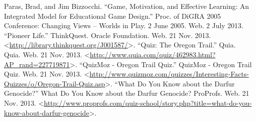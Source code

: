 \documentclass[12pt]{report}
\begin{document}
\begin{thebibliography}{1}
\bibitem{} Paras, Brad, and Jim Bizzocchi. ``Game, Motivation, and Effective Learning: An Integrated Model for Educational Game Design.'' Proc. of DiGRA 2005 Conference: Changing Views – Worlds in Play. 2 June 2005. Web. 2 July 2013.
\bibitem{} ``Pioneer Life.'' ThinkQuest. Oracle Foundation. Web. 21 Nov. 2013. \textless \url{http://library.thinkquest.org/J001587/}\textgreater.
\bibitem{} ``Quiz: The Oregon Trail.'' Quia. Quia. Web. 21 Nov. 2013. \textless \url{http://www.quia.com/quiz/462983.html?AP\_rand=227719871}\textgreater.
\bibitem{} ``QuizMoz - Oregon Trail Quiz.'' QuizMoz - Oregon Trail Quiz. Web. 21 Nov. 2013. \textless \url{http://www.quizmoz.com/quizzes/Interesting-Facts-Quizzes/o/Oregon-Trail-Quiz.asp}\textgreater.
\bibitem{} ``What Do You Know about the Darfur Genocide?'' What Do You Know about the Darfur Genocide? ProProfs. Web. 21 Nov. 2013. \textless \url{http://www.proprofs.com/quiz-school/story.php?title=what-do-you-know-about-darfur-genocide}\textgreater.

\end{thebibliography}
\end{document}

